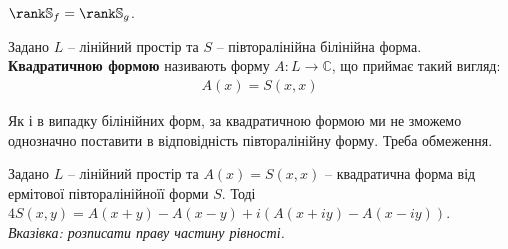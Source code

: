 \documentclass{math_library}
\begin{document}
\begin{corollary}
$\rank \mathbb{S}_f = \rank \mathbb{S}_g$.
\end{corollary}

\begin{definition}
Задано $L$ -- лінійний простір та $S$ -- півторалінійна білінійна форма.\\
\textbf{Квадратичною формою} називають форму $A \colon L \to \mathbb{C}$, що приймає такий вигляд:
\begin{align*}
A(x) = S(x,x)
\end{align*}
\end{definition}

\begin{remark}
Як і в випадку білінійних форм, за квадратичною формою ми не зможемо однозначно поставити в відповідність півторалінійну форму. Треба обмеження.
\end{remark}

\begin{proposition}
Задано $L$ -- лінійний простір та $A(x) = S(x,x)$ -- квадратична форма від ермітової півторалінійноїї форми $S$. Тоді $4S(x,y) = A(x+y) - A(x-y) + i(A(x+iy) - A(x-iy))$.\\
\textit{Вказівка: розписати праву частину рівності.}
\end{proposition}
\end{document}
